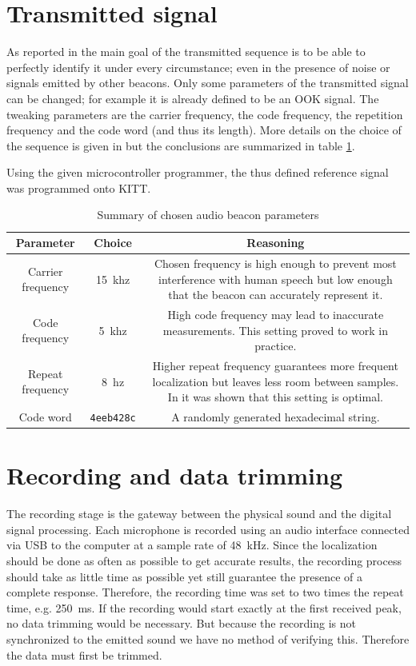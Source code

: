 \documentclass[11pt,titlepage]{report}
\begin{document}
\section{Transmitted signal}
\label{sec:loc_transmit}
As reported in \cite{epo4-del7} the main goal of the transmitted sequence is to be able to perfectly identify it under every circumstance; even in the presence of noise or signals emitted by other beacons. Only some parameters of the transmitted signal can be changed; for example it is already defined to be an OOK signal. The tweaking parameters are the carrier frequency, the code frequency, the repetition frequency and the code word (and thus its length). More details on the choice of the sequence is given in \cite{epo4-del7} but the conclusions are summarized in table \ref{tab:loc_signal}.

Using the given microcontroller programmer, the thus defined reference signal was programmed onto KITT.

\begin{table}[H]
\centering
\begin{tabular}{c | c | c}
\hline \hline
Parameter & Choice & Reasoning \\
\hline
Carrier frequency & \SI{15}{khz} & 
Chosen frequency is high enough to prevent most interference with human speech but low enough that the beacon can accurately represent it.\\
Code frequency & \SI{5}{khz} & High code frequency may lead to inaccurate measurements. This setting proved to work in practice.\\
Repeat frequency & \SI{8}{hz} & Higher repeat frequency guarantees more frequent localization but leaves less room between samples. In \cite{epo4-del7} it was shown that this setting is optimal.\\
Code word & \texttt{4eeb428c} & A randomly generated hexadecimal string.\\
\end{tabular}
\caption{Summary of chosen audio beacon parameters}
\label{tab:loc_signal}
\end{table}

\section{Recording and data trimming}
\label{sec:loc_data_trim}
The recording stage is the gateway between the physical sound and the digital signal processing. Each microphone is recorded using an audio interface connected via USB to the computer at a sample rate of \SI{48}{\kilo\hertz}. Since the localization should be done as often as possible to get accurate results, the recording process should take as little time as possible yet still guarantee the presence of a complete response. Therefore, the recording time was set to two times the repeat time, e.g. \SI{250}{\milli\second}. If the recording would start exactly at the first received peak, no data trimming would be necessary. But because the recording is not synchronized to the emitted sound we have no method of verifying this. Therefore the data must first be trimmed.
\end{document}
